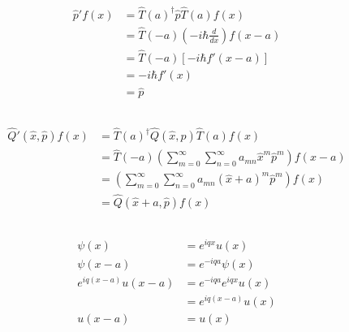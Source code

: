 \documentclass{article}
\begin{document}
\subsection{}

\begin{align*}
  \hat{p}' f(x) & = \hat{T}(a)^\dagger \hat{p} \hat{T}(a) f(x)                 \\
                & = \hat{T}(-a) \left( -i \hbar \frac{d}{d x} \right) f(x - a) \\
                & = \hat{T}(-a) [-i \hbar f'(x - a)]                           \\
                & = -i \hbar f'(x)                                             \\
                & = \hat{p}
\end{align*}

\subsection{}

\begin{align*}
  \hat{Q}'(\hat{x}, \hat{p}) f(x) & = \hat{T}(a)^\dagger \hat{Q}(\hat{x}, \hat{p}) \hat{T}(a) f(x)                                            \\
                                  & = \hat{T}(-a) \left( \sum_{m = 0}^\infty \sum_{n = 0}^\infty a_{m n} \hat{x}^m \hat{p}^m \right) f(x - a) \\
                                  & = \left( \sum_{m = 0}^\infty \sum_{n = 0}^\infty a_{m n} (\hat{x} + a)^m \hat{p}^m \right) f(x)           \\
                                  & = \hat{Q}(\hat{x} + a, \hat{p}) f(x)
\end{align*}

\subsection{}

\begin{align*}
  \psi(x)                  & = e^{i q x} u(x)            \\
  \psi(x - a)              & = e^{-i q a} \psi(x)        \\
  e^{i q (x - a)} u(x - a) & = e^{-i q a} e^{i q x} u(x) \\
                           & = e^{i q (x - a)} u(x)      \\
  u(x - a)                 & = u(x)
\end{align*}
\end{document}
